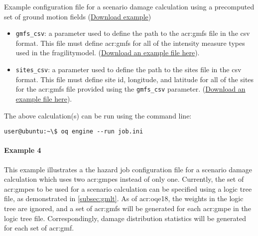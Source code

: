 \begin{listing}[htbp]
  \inputminted[firstline=1,firstnumber=1,fontsize=\footnotesize,frame=single,linenos,bgcolor=lightgray,label=job.ini]{ini}{oqum/risk/verbatim/config_scenario_damage_gmf_csv.ini}
  \caption{Example configuration file for a scenario damage calculation using a precomputed set of ground motion fields (\href{https://raw.githubusercontent.com/gem/oq-engine/master/doc/manual/oqum/risk/verbatim/config_scenario_damage_gmf_csv.ini}{Download example})}
  \label{lst:config_scenario_damage_gmf_csv}
\end{listing}

\begin{itemize}

  \item \Verb+gmfs_csv+: a parameter used to define the path
    to the \glspl{acr:gmf} file in the csv format. This file must
    define \glspl{acr:gmf} for all of the intensity measure types used in the
    \gls{fragilitymodel}.
    (\href{https://raw.githubusercontent.com/gem/oq-engine/master/doc/manual/oqum/risk/verbatim/input_scenario_gmfs.csv}{Download an example file here}).

  \item \Verb+sites_csv+: a parameter used to define the path
    to the sites file in the csv format. This file must
    define site id, longitude, and latitude for all of the sites for the
    \glspl{acr:gmf} file provided using the \Verb+gmfs_csv+ parameter. 
    (\href{https://raw.githubusercontent.com/gem/oq-engine/master/doc/manual/oqum/risk/verbatim/input_scenario_sites.csv}{Download an example file here}).

\end{itemize}

The above calculation(s) can be run using the command line:

\begin{verbatim}
user@ubuntu:~\$ oq engine --run job.ini
\end{verbatim}


\paragraph{Example 4}

This example illustrates a the hazard job configuration file for a scenario
damage calculation which uses two \glspl{acr:gmpe} instead of only one.
Currently, the set of \glspl{acr:gmpe} to be used for a scenario calculation
can be specified using a logic tree file, as demonstrated in
\ref{subsec:gmlt}. As of \glsdesc{acr:oqe18}, the weights in the logic tree
are ignored, and a set of \glspl{acr:gmf} will be generated for each
\gls{acr:gmpe} in the logic tree file. Correspondingly, damage distribution
statistics will be generated for each set of \gls{acr:gmf}.

